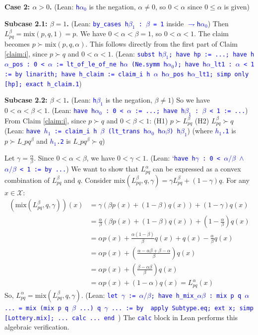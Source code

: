\documentclass{article}
\theoremstyle{definition}
\newcommand{\X}{\mathcal{X}}
\newcommand{\tactic}[1]{\textcolor{blue}{\texttt{#1}}}
\newcommand{\strictpref}{\succ} %
\newcommand{\mix}{\mathrm{mix}} %
\begin{document}
\textbf{Case 2: $\alpha > 0$.} (Lean: \tactic{h$\alpha_0$} is the negation, $\alpha \ne 0$, so $0 < \alpha$ since $0 \le \alpha$ is given)

    \textbf{Subcase 2.1: $\beta = 1$.} (Lean: \tactic{by\_cases h$\beta_1$ : $\beta$ = 1} inside \tactic{$\rightharpoondown$h$\alpha_0$})
    Then $L_{pq}^\beta = \mix(p, q, 1) = p$.
    We have $0 < \alpha < \beta = 1$, so $0 < \alpha < 1$.
    The claim becomes $p \strictpref \mix(p, q, \alpha)$.
    This follows directly from the first part of Claim \ref{claim:i}, since $p \strictpref q$ and $0 < \alpha < 1$.
    (Lean: \tactic{subst h$\beta_1$; have hp := ...; have h$\alpha$\_pos : 0 < $\alpha$ := lt\_of\_le\_of\_ne h$\alpha$ (Ne.symm h$\alpha_0$); have h$\alpha$\_lt1 : $\alpha$ < 1 := by linarith; have h\_claim := claim\_i h $\alpha$ h$\alpha$\_pos h$\alpha$\_lt1; simp only [hp]; exact h\_claim.1})

    \textbf{Subcase 2.2: $\beta < 1$.} (Lean: \tactic{h$\beta_1$} is the negation, $\beta \ne 1$)
    So we have $0 < \alpha < \beta < 1$.
    (Lean: \tactic{have h$\alpha_0$ : 0 < $\alpha$ := ...; have h$\beta_1$ : $\beta$ < 1 := ...})
    From Claim \ref{claim:i}, since $p \strictpref q$ and $0 < \beta < 1$:
    (H1) $p \strictpref L_{pq}^\beta$
    (H2) $L_{pq}^\beta \strictpref q$
    (Lean: \tactic{have $h_1$ := claim\_i h $\beta$ (lt\_trans h$\alpha_0$ h$\alpha\beta$) h$\beta_1$}) (where \tactic{$h_1$.1} is $p \strictpref L\_{pq}^\beta$ and \tactic{$h_1$.2} is $L\_{pq}^\beta \strictpref q$)

    Let $\gamma = \frac{\alpha}{\beta}$. Since $0 < \alpha < \beta$, we have $0 < \gamma < 1$.
    (Lean: `\tactic{have h$\gamma$ : 0 < $\alpha/\beta$ $\wedge$ $\alpha/\beta$ < 1 := by ...})
    We want to show that $L_{pq}^\alpha$ can be expressed as a convex combination of $L_{pq}^\beta$ and $q$.
    Consider $\mix(L_{pq}^\beta, q, \gamma) = \gamma L_{pq}^\beta + (1-\gamma)q$.
    For any $x \in \X$:
    \begin{align*}
    (\mix(L_{pq}^\beta, q, \gamma))(x) &= \gamma (\beta p(x) + (1-\beta)q(x)) + (1-\gamma)q(x) \\
    &= \frac{\alpha}{\beta} (\beta p(x) + (1-\beta)q(x)) + (1-\frac{\alpha}{\beta})q(x) \\
    &= \alpha p(x) + \frac{\alpha(1-\beta)}{\beta}q(x) + q(x) - \frac{\alpha}{\beta}q(x) \\
    &= \alpha p(x) + \left( \frac{\alpha - \alpha\beta + \beta - \alpha}{\beta} \right) q(x) \\
    &= \alpha p(x) + \left( \frac{\beta - \alpha\beta}{\beta} \right) q(x) \\
    &= \alpha p(x) + (1-\alpha)q(x) = L_{pq}^\alpha(x)
    \end{align*}
    So, $L_{pq}^\alpha = \mix(L_{pq}^\beta, q, \gamma)$.
    (Lean: \tactic{let $\gamma$ := $\alpha/\beta$; have h\_mix\_$\alpha\beta$ : mix p q $\alpha$ ... = mix (mix p q $\beta$ ...) q $\gamma$ ... := by { apply Subtype.eq; ext x; simp [Lottery.mix]; ... calc ... end }}) The \tactic{calc} block in Lean performs this algebraic verification.
\end{document}
